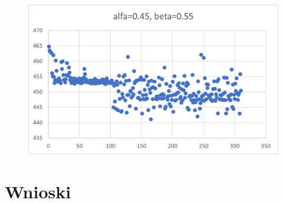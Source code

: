 \documentclass[12pt]{mwart}
\begin{document}
	\begin{figure}[H]
		\centering
		\includegraphics{470_a0.45.png}
	\end{figure}
	\section{Wnioski}
\end{document}
